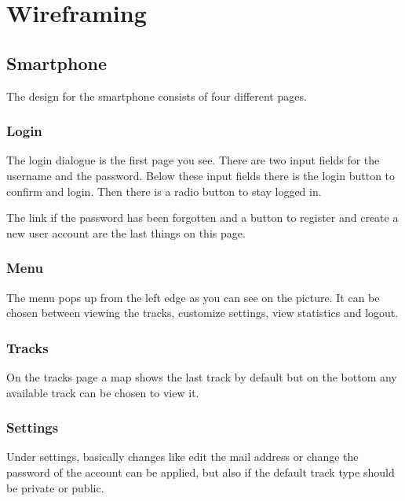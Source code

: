 \chapter{Wireframing}
\section{Smartphone}
The design for the smartphone consists of four different pages. 
\subsection{Login}
The login dialogue is the first page you see. There are two input fields for the username and the password. Below these input fields there is the login button to confirm and login. Then there is a radio button to stay logged in.

The link if the password has been forgotten and a button to register and create a new user account are the last things on this page.
\subsection{Menu}
The menu pops up from the left edge as you can see on the picture. It can be chosen between viewing the tracks, customize settings, view statistics and logout.
\subsection{Tracks}
On the tracks page a map shows the last track by default but on the bottom any available track can be chosen to view it.
\subsection{Settings}
Under settings, basically changes like edit the mail address or change the password of the account can be applied, but also if the default track type should be private or public.
